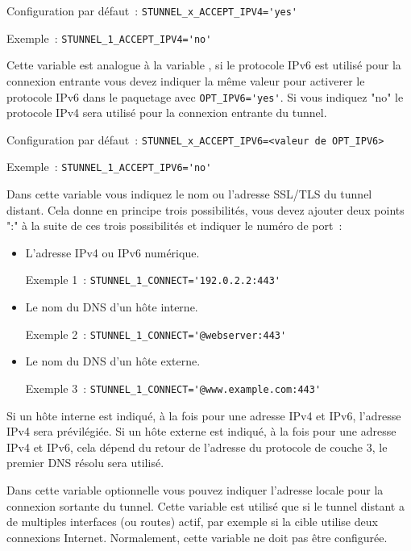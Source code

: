 \begin{description}
Configuration par défaut~: \verb+STUNNEL_x_ACCEPT_IPV4='yes'+

Exemple~: \verb+STUNNEL_1_ACCEPT_IPV4='no'+


Cette variable est analogue à la variable , si le protocole IPv6
est utilisé pour la connexion entrante vous devez indiquer la même valeur pour activerer
le protocole IPv6 dans le paquetage avec \verb+OPT_IPV6='yes'+. Si vous indiquez "no" le protocole
IPv4 sera utilisé pour la connexion entrante du tunnel.

Configuration par défaut~: \verb+STUNNEL_x_ACCEPT_IPV6=<valeur de OPT_IPV6>+

Exemple~: \verb+STUNNEL_1_ACCEPT_IPV6='no'+


Dans cette variable vous indiquez le nom ou l'adresse SSL/TLS du tunnel distant. Cela donne en
principe trois possibilités, vous devez ajouter deux points ":" à la suite de ces trois possibilités
et indiquer le numéro de port~:

\begin{itemize}
\item L'adresse IPv4 ou IPv6 numérique.

Exemple 1~: \verb+STUNNEL_1_CONNECT='192.0.2.2:443'+

\item Le nom du DNS d'un hôte interne.

Exemple 2~: \verb+STUNNEL_1_CONNECT='@webserver:443'+

\item Le nom du DNS d'un hôte externe.

Exemple 3~: \verb+STUNNEL_1_CONNECT='@www.example.com:443'+
\end{itemize}

Si un hôte interne est indiqué, à la fois pour une adresse IPv4 et IPv6, l'adresse IPv4 sera
prévilégiée. Si un hôte externe est indiqué, à la fois pour une adresse IPv4 et IPv6, cela dépend
du retour de l'adresse du protocole de couche 3, le premier DNS résolu sera utilisé.


Dans cette variable optionnelle vous pouvez indiquer l'adresse locale pour la connexion sortante
du tunnel. Cette variable est utilisé que si le tunnel distant a de multiples interfaces (ou routes)
actif, par exemple si la cible utilise deux connexions Internet. Normalement, cette variable ne
doit pas être configurée.


\end{description}

